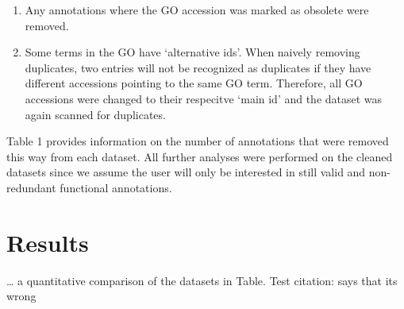 \documentclass[utf8]{frontiersSCNS}
\providecommand{\tightlist}{%
  \setlength{\itemsep}{0pt}\setlength{\parskip}{0pt}}
\begin{document}
\begin{enumerate}
\def\labelenumi{\arabic{enumi}.}
\tightlist
\item
  Any annotations where the GO accession was marked as obsolete were removed.
\item
  Some terms in the GO have `alternative ids'. When naively removing duplicates, two entries will not be recognized as duplicates if they have different accessions pointing to the same GO term. Therefore, all GO accessions were changed to their respecitve `main id' and the dataset was again scanned for duplicates.
\end{enumerate}

Table 1 provides information on the number of annotations that were removed this way from each dataset.
All further analyses were performed on the cleaned datasets since we assume the user will only be interested in still valid and non-redundant functional annotations.

\hypertarget{results}{%
\section{Results}\label{results}}

\ldots{} a quantitative comparison of the datasets in Table.
Test citation: \citet{Neuro2013} says that its wrong \citep{Gene2012}
\end{document}
